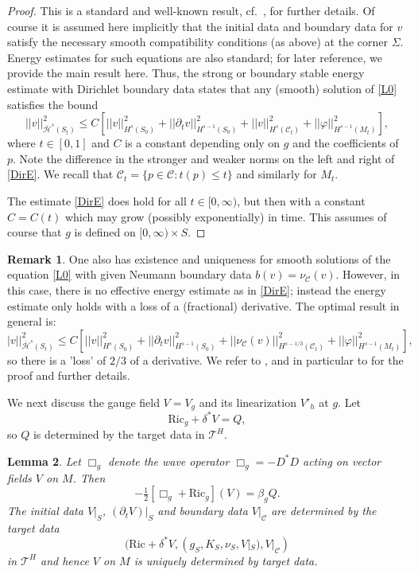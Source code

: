 \documentclass[10pt]{amsart}
\renewcommand{\b}{\beta}
\renewcommand{\d}{\delta}
\newcommand{\f}{\varphi}
\newcommand{\Si}{\Sigma}
\newcommand{\cC}{{\mathcal C}}
\newcommand{\cT}{{\mathcal T}}
\newcommand{\cH}{{\mathcal H}}
\newcommand{\Ric}{\mathrm{Ric}}
\newcommand{\be}{\begin{equation}}
\newcommand{\ee}{\end{equation}}
\newcommand{\p}{\partial}
\newcommand{\<}{\langle}
\renewcommand{\>}{\rangle}
\theoremstyle{plain}
\newtheorem{lemma}{Lemma}[section]
\theoremstyle{remark}
\theoremstyle{definition}
\newtheorem{remark}[lemma]{Remark}
\numberwithin{equation}{section}
\begin{document}
\begin{proof} 

  This is a standard and well-known result, cf.~\cite{BS}, \cite{Sa} for further details. Of course it is assumed here implicitly that the initial data 
and boundary data for $v$ satisfy the necessary smooth compatibility conditions (as above) at the corner $\Si$. Energy estimates for such 
equations are also standard; for later reference, we provide the main result here. Thus, the strong or boundary stable energy estimate with 
Dirichlet boundary data states that any (smooth) solution of \eqref{L0} satisfies the bound 
\be \label{DirE}
||v||_{\bar \cH^s(S_t)}^2 \leq C[||v||_{H^s(S_0)}^2 + ||\p_t v||_{H^{s-1}(S_0)}^2 + ||v||_{H^s(\cC_t)}^2 + ||\f||_{H^{s-1}(M_t)}^2],
\ee
where $t \in [0,1]$ and $C$ is a constant depending only on $g$ and the coefficients of $p$. Note the difference in the stronger and weaker 
norms on the left and right of \eqref{DirE}. We recall that $\cC_t = \{p \in \cC: t(p) \leq t\}$ and similarly for $M_t$. 

   The estimate \eqref{DirE} does hold for all $t \in [0, \infty)$, but then with a constant $C = C(t)$ which may grow (possibly exponentially) in time. 
This assumes of course that $g$ is defined on $[0, \infty)\times S$. 

\end{proof}

\begin{remark} \label{Neumann} 
{\rm One also has existence and uniqueness for smooth solutions of the equation \eqref{L0} with given Neumann boundary data $b(v) = \nu_{\cC}(v)$. 
However, in this case, there is no effective energy estimate as in \eqref{DirE}; instead the energy estimate only holds with a loss of a (fractional) derivative. 
The optimal result in general is: 
\be \label{NeuE}
|v||_{\bar \cH^s(S_t)}^2 \leq C[||v||_{H^s(S_0)}^2 + ||\p_t v||_{H^{s-1}(S_0)}^2 + ||\nu_{\cC}(v)||_{H^{s-1/3}(\cC_t)}^2 + ||\f||_{H^{s-1}(M_t)}^2],
\ee
so there is a 'loss' of $2/3$ of a derivative. We refer to \cite[Ch.8]{MT}, and in particular to \cite[Thm.9]{Tat} for the proof and further details. 
}
\end{remark}

 We next discuss the gauge field $V = V_g$ and its linearization $V'_h$ at $g$. Let 
\be \label{V0}
\Ric_g + \d^*V = Q,
\ee
so $Q$ is determined by the target data in $\cT^H$.  

\begin{lemma}\label{Gauge-lemma}
Let $\Box_g$ denote the wave operator $\Box_g = - D^*D$ acting on vector fields $V$ on $M$. Then  
\be \label{V}
-\tfrac{1}{2}[\Box_g + \Ric_g](V) = \b_g Q.
\ee
The initial data $V|_S$, $(\p_t V)|_S$ and boundary data $V|_{\cC}$ are determined by the target data  
$$(\Ric + \d^*V, (g_S, K_S, \nu_S, V|_S), V|_{\cC})$$
in $\cT^H$ and hence $V$ on $M$ is uniquely determined by target data. 

\end{lemma}
\end{document}
